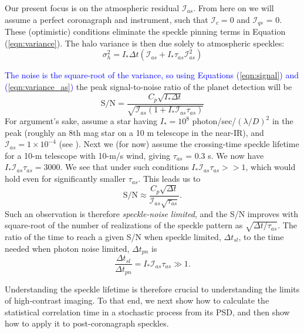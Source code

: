 \documentclass[10pt,preprint]{aastex631}
\newcommand{\jrmadd}[1]{\textcolor{blue}{#1}}
\begin{document}
Our present focus is on the atmospheric residual $\mathcal{I}_{as}$.  From here on we will assume a perfect coronagraph and instrument, such that $\mathcal{I}_c = 0$ and $\mathcal{I}_{qs}$ = 0.  These (optimistic) conditions eliminate the speckle pinning \citep{2001ApJ...558L..71B} terms in Equation (\ref{eqn:variance}).  The halo variance is then due solely to atmospheric speckles:
\begin{equation}
\sigma^2_{h}  = I_* \Delta t \left(\mathcal{I}_{as} + I_* \tau_{as} \mathcal{I}_{as}^2 \right)
\label{eqn:variance_as}
\end{equation}

\jrmadd{The noise is the square-root of the variance, so using Equations (\ref{eqn:signal}) and  (\ref{eqn:variance_as})} the peak signal-to-noise ratio of the planet detection will be
\begin{equation}
\mbox{S/N} = \frac{C_p \sqrt{I_* \Delta t}}{ \sqrt{\mathcal{I}_{as} (1 + I_*\mathcal{I}_{as} \tau_{as})}} 
\end{equation}
For argument's sake, assume a star having $I_* = 10^8$ photon/sec/$(\lambda/D)^2$ in the peak (roughly an 8th mag star on a 10 m telescope in the near-IR), and $\mathcal{I}_{as} = 1\times10^{-4}$ (see \citealt{2018JATIS...4a9001M}).  Next we (for now) assume the \citet{2005SPIE.5903..170M} crossing-time speckle lifetime for a 10-m telescope with 10-m/s wind, giving $\tau_{as}$ = 0.3 s.  We now have $I_*\mathcal{I}_{as} \tau_{as} = 3000$.  We see that under such conditions  $I_*\mathcal{I}_{as} \tau_{as} >> 1$, which would hold even for significantly smaller $\tau_{as}$.  This leads us to
\begin{equation}
\mbox{S/N} \approx \frac{C_p \sqrt{\Delta t}}{ \mathcal{I}_{as} \sqrt{\tau_{as}}}. 
\end{equation}
Such an observation is therefore \emph{speckle-noise limited}, and the S/N improves with square-root of the number of realizations of the speckle pattern as $\sqrt{\Delta t/ \tau_{as}}$.  The ratio of the time to reach a given S/N when speckle limited, $\Delta t_{sl}$, to the time needed when photon noise limited, $\Delta t_{pn}$ is
\begin{equation}
\frac{\Delta t_{sl}}{\Delta t_{pn}} = I_*\mathcal{I}_{as} \tau_{as} \gg 1.
\label{eqn:relexptime}
\end{equation}

Understanding the speckle lifetime is therefore crucial to understanding the limits of high-contrast imaging.  To that end, we next show how to calculate the statistical correlation time in a stochastic process from its PSD, and then show how to apply it to post-coronagraph speckles.
\end{document}
